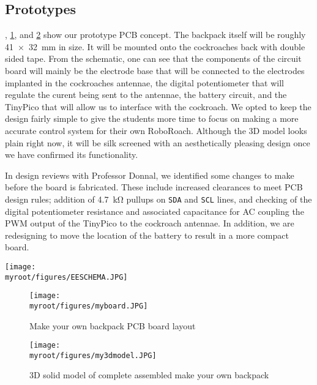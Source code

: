 \documentclass[twocolumn,10pt]{IEEEtran}
\newcommand{\myroot}{.}
\begin{document}
\subsection{Prototypes}
, \ref{fig:board}, and \ref{fig:3d} show our prototype PCB concept. The backpack itself will be roughly \SI{41x32}{\milli\meter} in size. It will be mounted onto the cockroaches back with double sided tape. From the schematic, one can see that the components of the circuit board will mainly be the electrode base that will be connected to the electrodes implanted in the cockroaches antennae, the digital potentiometer that will regulate the curent being sent to the antennae, the battery circuit, and the TinyPico that will allow us to interface with the cockroach. We opted to keep the design fairly simple to give the students more time to focus on making a more accurate control system for their own RoboRoach. Although the 3D model looks plain right now, it will be silk screened with an aesthetically pleasing design once we have confirmed its functionality.

In design reviews with Professor Donnal, we identified some changes to make before the board is fabricated. These include increased clearances to meet PCB design rules; addition of \SI{4.7}{\kilo\ohm} pullups on \lstinline{SDA} and \lstinline{SCL} lines, and checking of the digital potentiometer resistance and associated capacitance for AC coupling the PWM output of the TinyPico to the cockroach antennae. In addition, we are redesigning to move the location of the battery to result in a more compact board. 
\begin{figure*}[ht!]
\centering
\texttt{[image: \\myroot/figures/EESCHEMA.JPG]}
\caption{Make your own backpack PCB complete system schematic}
\label{fig:schematic}
\end{figure*}
\begin{figure}[ht!]
\centering
\texttt{[image: \\myroot/figures/myboard.JPG]}
\caption{Make your own backpack PCB board layout}
\label{fig:board}
\end{figure}
\begin{figure}[ht!]
\centering
\texttt{[image: \\myroot/figures/my3dmodel.JPG]}
\caption{3D solid model of complete assembled make your own backpack}
\label{fig:3d}
\end{figure}
\end{document}
